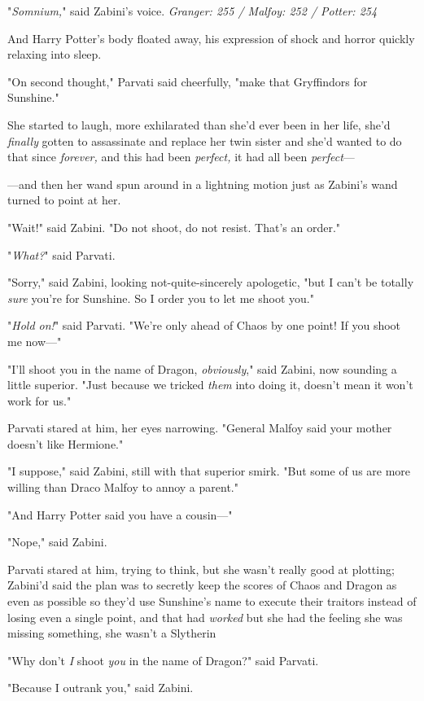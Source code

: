 "\emph{Somnium,}" said Zabini's voice.
\sbreak
\emph{Granger: 255 / Malfoy: 252 / Potter: 254}

And Harry Potter's body floated away, his expression of shock and horror
quickly relaxing into sleep.

"On second thought," Parvati said cheerfully, "make that Gryffindors for
Sunshine."

She started to laugh, more exhilarated than she'd ever been in her life, she'd
\emph{finally} gotten to assassinate and replace her twin sister and she'd
wanted to do that since \emph{forever,} and this had been \emph{perfect,} it
had all been \emph{perfect}---

---and then her wand spun around in a lightning motion just as Zabini's wand
turned to point at her.

"Wait!" said Zabini. "Do not shoot, do not resist. That's an order."

"\emph{What?}" said Parvati.

"Sorry," said Zabini, looking not-quite-sincerely apologetic, "but I can't be
totally \emph{sure} you're for Sunshine. So I order you to let me shoot you."

"\emph{Hold on!}" said Parvati. "We're only ahead of Chaos by one point! If you
shoot me now---"

"I'll shoot you in the name of Dragon, \emph{obviously}," said Zabini, now
sounding a little superior. "Just because we tricked \emph{them} into doing it,
doesn't mean it won't work for us."

Parvati stared at him, her eyes narrowing. "General Malfoy said your mother
doesn't like Hermione."

"I suppose," said Zabini, still with that superior smirk. "But some of us are
more willing than Draco Malfoy to annoy a parent."

"And Harry Potter said you have a cousin---"

"Nope," said Zabini.

Parvati stared at him, trying to think, but she wasn't really good at plotting;
Zabini'd said the plan was to secretly keep the scores of Chaos and Dragon as
even as possible so they'd use Sunshine's name to execute their traitors
instead of losing even a single point, and that had \emph{worked}{\el}
but{\el} she had the feeling she was missing something, she wasn't a
Slytherin{\el}

"Why don't \emph{I} shoot \emph{you} in the name of Dragon?" said Parvati.

"Because I outrank you," said Zabini.

